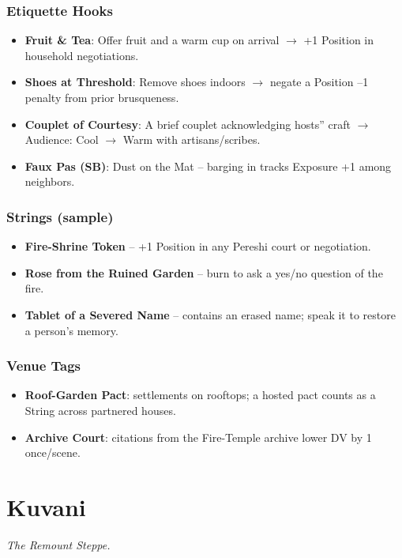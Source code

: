 \documentclass[12pt,oneside]{book}
\begin{document}
\subsection*{Etiquette Hooks}
\begin{itemize}
  \item \textbf{Fruit \& Tea}: Offer fruit and a warm cup on arrival $\rightarrow$ +1 Position in household negotiations.
  \item \textbf{Shoes at Threshold}: Remove shoes indoors $\rightarrow$ negate a Position --1 penalty from prior brusqueness.
  \item \textbf{Couplet of Courtesy}: A brief couplet acknowledging hosts'' craft $\rightarrow$ Audience: Cool $\rightarrow$ Warm with artisans/scribes.
  \item \textbf{Faux Pas (SB)}: Dust on the Mat -- barging in tracks Exposure +1 among neighbors.
\end{itemize}

\subsection*{Strings (sample)}
\begin{itemize}
  \item \textbf{Fire-Shrine Token} -- +1 Position in any Pereshi court or negotiation.
  \item \textbf{Rose from the Ruined Garden} -- burn to ask a yes/no question of the fire.
  \item \textbf{Tablet of a Severed Name} -- contains an erased name; speak it to restore a person's memory.
\end{itemize}

\subsection*{Venue Tags}
\begin{itemize}
  \item \textbf{Roof-Garden Pact}: settlements on rooftops; a hosted pact counts as a String across partnered houses.
  \item \textbf{Archive Court}: citations from the Fire-Temple archive lower DV by 1 once/scene.
\end{itemize}

\newpage

\newpage

\chapter{Kuvani}
\emph{The Remount Steppe.}
\end{document}
